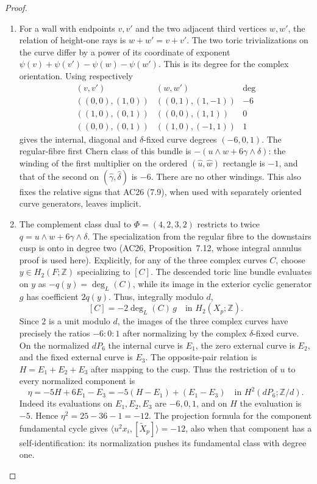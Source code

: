 \begin{proof}
\begin{enumerate}[label=\arabic*.,leftmargin=*]
\item For a wall with endpoints $v,v'$ and the two adjacent third vertices
$w,w'$, the relation of height-one rays is $w+w'=v+v'$.
The two toric trivializations on the curve differ by a power of its
coordinate of exponent
$\psi(v)+\psi(v')-\psi(w)-\psi(w')$. This is its degree for the
complex orientation. Using respectively
\[
 \begin{array}{c|c|c}
 (v,v')&(w,w')&\deg\\\hline
 ((0,0),(1,0))&((0,1),(1,-1))&-6\\
 ((1,0),(0,1))&((0,0),(1,1))&0\\
 ((0,0),(0,1))&((1,0),(-1,1))&1
 \end{array}
\]
gives the internal, diagonal and $\delta$-fixed curve degrees
$(-6,0,1)$. The regular-fibre first Chern class of this bundle is
$-(u\wedge w+6\gamma\wedge\delta)$: the winding of the first
multiplier on the ordered $(\widehat u,\widehat w)$ rectangle is
$-1$, and that of the second on
$(\widehat\gamma,\widehat\delta)$ is $-6$.
There are no other windings. This also fixes the relative signs
that AC26 (7.9), when used with separately oriented curve generators,
leaves implicit.

\item The complement class dual to $\Phi=(4,2,3,2)$ restricts to twice
$q=u\wedge w+6\gamma\wedge\delta$. The specialization from the
regular fibre to the downstairs cusp is onto in degree two
(AC26, Proposition~7.12, whose integral annulus proof is used here).
Explicitly, for any of the three complex curves $C$, choose
$y\in H_2(F;\mathbb Z)$ specializing to $[C]$. The descended
toric line bundle evaluates on $y$ as $-q(y)=\deg_L(C)$,
while its image in the exterior cyclic generator $g$ has
coefficient $2q(y)$. Thus, integrally modulo $d$,
\[
 [C]=-2\deg_L(C)\,g\quad\text{in }H_2(X_p;\mathbb Z).
\]
Since $2$ is a unit modulo $d$, the images of the three
complex curves have precisely the ratios $-6:0:1$ after
normalizing by the complex $\delta$-fixed curve. On the normalized $dP_6$ the
internal curve is $E_1$, the zero external curve is $E_2$, and the
fixed external curve is $E_3$. The opposite-pair relation is
$H=E_1+E_2+E_3$ after mapping to the cusp. Thus the restriction of
$u$ to every normalized component is
\[
 \eta=-5H+6E_1-E_3=-5(H-E_1)+(E_1-E_3)
 \quad\text{in }H^2(dP_6;\mathbb Z/d).
\]
Indeed its evaluations on $E_1,E_2,E_3$ are $-6,0,1$, and on $H$
the evaluation is $-5$. Hence $\eta^2=25-36-1=-12$.
The projection formula for the component fundamental cycle gives
$\langle u^2x_i,[\widetilde X_p]\rangle=-12$, also when that
component has a self-identification: its normalization pushes its
fundamental class with degree one.


\end{enumerate}
\end{proof}
